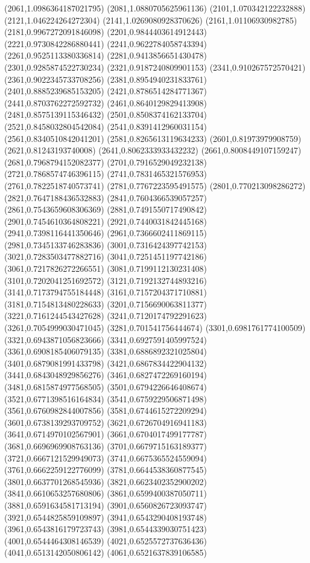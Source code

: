 {(2061,1.0986364187021795)
(2081,1.0880705625961136)
(2101,1.070342122232888)
(2121,1.046224264272304)
(2141,1.0269080928370626)
(2161,1.01106930982785)
(2181,0.9967272091846098)
(2201,0.9844403614912443)
(2221,0.9730842286880441)
(2241,0.9622784058743394)
(2261,0.9525113380336814)
(2281,0.9413856651430478)
(2301,0.9285874522730234)
(2321,0.9187240809901153)
(2341,0.910267572570421)
(2361,0.9022345733708256)
(2381,0.8954940231833761)
(2401,0.8885239685153205)
(2421,0.8786514284771367)
(2441,0.8703762272592732)
(2461,0.8640129829413908)
(2481,0.8575139115346432)
(2501,0.8508374162133704)
(2521,0.8458032804542084)
(2541,0.8391412960031154)
(2561,0.8340510842041201)
(2581,0.8265613119634233)
(2601,0.81973979908759)
(2621,0.81243193740008)
(2641,0.8062333933432232)
(2661,0.8008449107159247)
(2681,0.7968794152082377)
(2701,0.7916529049232138)
(2721,0.7868574746396115)
(2741,0.7831465321576953)
(2761,0.7822518740573741)
(2781,0.7767223595491575)
(2801,0.770213098286272)
(2821,0.7647188436532883)
(2841,0.7604366539057257)
(2861,0.7543659608306369)
(2881,0.7491550717490842)
(2901,0.7454610364808221)
(2921,0.7440031842445168)
(2941,0.7398116441350646)
(2961,0.7366602411869115)
(2981,0.7345133746283836)
(3001,0.7316424397742153)
(3021,0.7283503477882716)
(3041,0.7251451197742186)
(3061,0.7217826272266551)
(3081,0.7199112130231408)
(3101,0.7202041251692572)
(3121,0.7192132744893216)
(3141,0.7173794755184448)
(3161,0.7157204371710881)
(3181,0.7154813480228633)
(3201,0.7156690063811377)
(3221,0.7161244543427628)
(3241,0.7120174792291623)
(3261,0.7054999030471045)
(3281,0.701541756444674)
(3301,0.6981761774100509)
(3321,0.6943871056823666)
(3341,0.6927591405997524)
(3361,0.6908185406079135)
(3381,0.6886892321025804)
(3401,0.6879081991433798)
(3421,0.6867834422904132)
(3441,0.6843048929856276)
(3461,0.6827472269160194)
(3481,0.6815874977568505)
(3501,0.6794226646408674)
(3521,0.6771398516164834)
(3541,0.6759229506871498)
(3561,0.6760982844007856)
(3581,0.6744615272209294)
(3601,0.6738139293709752)
(3621,0.6726704916941183)
(3641,0.6714970102567901)
(3661,0.6704017499177787)
(3681,0.6696969908763136)
(3701,0.6679715163189377)
(3721,0.6667121529949073)
(3741,0.6675365524559094)
(3761,0.6662259122776099)
(3781,0.6644538360877545)
(3801,0.6637701268545936)
(3821,0.6623402352900202)
(3841,0.6610653257680806)
(3861,0.6599400387050711)
(3881,0.6591634581713194)
(3901,0.6560826723093747)
(3921,0.6544825859109897)
(3941,0.6543290408193748)
(3961,0.6543816179723743)
(3981,0.6544339030751423)
(4001,0.6544464308146539)
(4021,0.6525572737636436)
(4041,0.6513142050806142)
(4061,0.6521637839106585)
}
